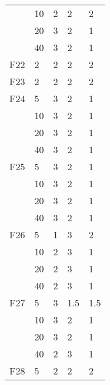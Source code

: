 \begin{longtable}{|l|l|l|l|l|}
             & 10  & 2    & 2                & 2                \\ \cmidrule{2-5}
             & 20  & 3    & 2                & 1                \\ \cmidrule{2-5}
             & 40  & 3    & 2                & 1                \\ \midrule
F22          & 2   & 2    & 2                & 2                \\ \midrule
F23          & 2   & 2    & 2                & 2                \\ \midrule
F24          & 5   & 3    & 2                & 1                \\ \cmidrule{2-5}
             & 10  & 3    & 2                & 1                \\ \cmidrule{2-5}
             & 20  & 3    & 2                & 1                \\ \cmidrule{2-5}
             & 40  & 3    & 2                & 1                \\ \midrule
F25          & 5   & 3    & 2                & 1                \\ \cmidrule{2-5}
             & 10  & 3    & 2                & 1                \\ \cmidrule{2-5}
             & 20  & 3    & 2                & 1                \\ \cmidrule{2-5}
             & 40  & 3    & 2                & 1                \\ \midrule
F26          & 5   & 1    & 3                & 2                \\ \cmidrule{2-5}
             & 10  & 2    & 3                & 1                \\ \cmidrule{2-5}
             & 20  & 2    & 3                & 1                \\ \cmidrule{2-5}
             & 40  & 2    & 3                & 1                \\ \midrule
F27          & 5   & 3    & 1.5              & 1.5              \\ \cmidrule{2-5}
             & 10  & 3    & 2                & 1                \\ \cmidrule{2-5}
             & 20  & 3    & 2                & 1                \\ \cmidrule{2-5}
             & 40  & 2    & 3                & 1                \\ \midrule
F28          & 5   & 2    & 2                & 2                \\ \cmidrule{2-5}

\end{longtable}

